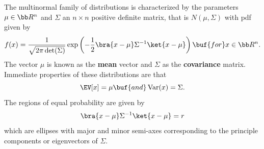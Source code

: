 \documentclass[12pt,letterpaper]{article}
\newcommand{\Var}{\operatorname{Var}}
\begin{document}
The multinormal family of distributions is characterized by the parameters $\mu \in \bb R^n$ and $\Sigma$ an $n\times n$ positive definite matrix, that is $N(\mu,\Sigma)$  with pdf given by
\begin{equation*}
	f(x) = \dfrac{1}{\sqrt{2\pi\det(\Sigma)}} \operatorname{exp}\left(-\dfrac 12\bra{x-\mu}\Sigma^{-1}\ket{x-\mu}\right) \buf{for} x \in \bb R^n.
\end{equation*}
The vector $\mu$ is known as the \textbf{mean} vector and $\Sigma$ as the \textbf{covariance} matrix.
Immediate properties of these distributions are that
\begin{equation*}
	\EV[x] = \mu \buf{and} \Var(x) = \Sigma.
\end{equation*}
The regions of equal probability are given by
\begin{equation*}
	\bra{x-\mu}\Sigma^{-1}\ket{x-\mu} = r
\end{equation*}
which are ellipses with major and minor semi-axes corresponding to the principle components or eigenvectors of $\Sigma$.
\end{document}
